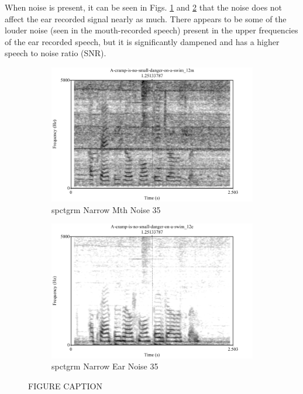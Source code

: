 \documentclass[dissertation,copyright]{uathesis}
\begin{document}
When noise is present, it can be seen in Figs. \ref{spctgrmNarrowMouthNoise_35} and \ref{spctgrmNarrowEarNoise_35} that the noise does not affect the ear recorded signal nearly as much.  There appears to be some of the louder noise (seen in the mouth-recorded speech) present in the upper frequencies of the ear recorded speech, but it is significantly dampened and has a higher speech to noise ratio (SNR).

\begin{figure}
\centering
\begin{subfigure}{0.5\textwidth}
  \centering
  \includegraphics[width=1\linewidth]{figure/spctgrmNarrowMthNoise_35.pdf}
  \caption{spctgrm Narrow Mth Noise 35}
  \label{spctgrmNarrowMouthNoise_35}
\end{subfigure}%
\hfill
\begin{subfigure}{0.5\textwidth}
  \centering
  \includegraphics[width=1\linewidth]{figure/spctgrmNarrowEarNoise_35.pdf}
  \caption{spctgrm Narrow Ear Noise 35}
  \label{spctgrmNarrowEarNoise_35}
\end{subfigure}
\caption{FIGURE CAPTION}
\label{fig:noise_mth_ear}
\end{figure}
\end{document}
